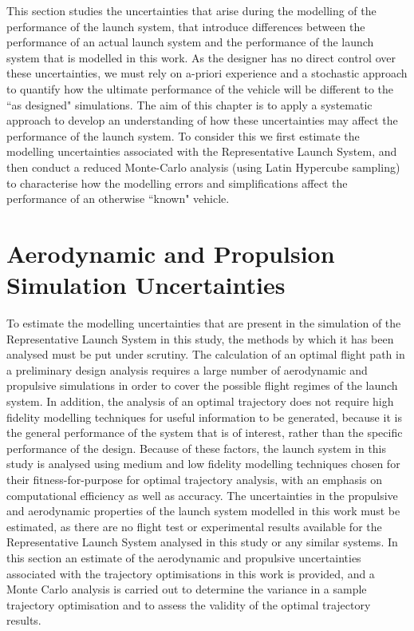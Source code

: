 This section studies the uncertainties that arise during the modelling of the performance of the launch system, that introduce differences between the performance of an actual launch system and the performance of the launch system that is modelled in this work. 
As the designer has no direct control over these uncertainties, we must rely on a-priori experience and a stochastic approach to quantify how the ultimate performance of the vehicle will be different to the ``as designed" simulations. The aim of this chapter is to apply a systematic approach to develop an understanding of how these uncertainties may affect the performance of the launch system. To consider this we first estimate the modelling uncertainties associated with the Representative Launch System, and then conduct a reduced Monte-Carlo analysis (using Latin Hypercube sampling) to characterise how the modelling errors and simplifications affect the performance of an otherwise ``known" vehicle.




\section{Aerodynamic and Propulsion Simulation Uncertainties}\label{sec:aerounc}

To estimate the modelling uncertainties that are present in the simulation of the Representative Launch System in this study, the methods by which it has been analysed must be put under scrutiny. 
The calculation of an optimal flight path in a preliminary design analysis requires a large number of aerodynamic and propulsive simulations in order to cover the possible flight regimes of the launch system. In addition, the analysis of an optimal trajectory does not require high fidelity modelling techniques for useful information to be generated, because it is the general performance of the system that is of interest, rather than the specific performance of the design. Because of these factors, the launch system in this study is analysed using medium and low fidelity modelling techniques chosen for their fitness-for-purpose for optimal trajectory analysis, with an emphasis on computational efficiency as well as accuracy.
The uncertainties in the propulsive and aerodynamic properties of the launch system modelled in this work must be estimated, as there are no flight test or experimental results available for the Representative Launch System analysed in this study or any similar systems. In this section an estimate of the aerodynamic and propulsive uncertainties associated with the trajectory optimisations in this work is provided, and a Monte Carlo analysis is carried out to determine the variance in a sample trajectory optimisation and to assess the validity of the optimal trajectory results. 

